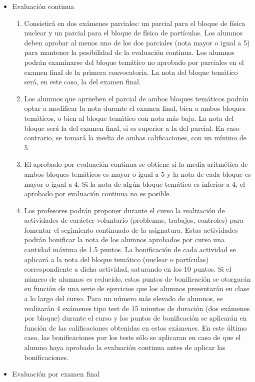 \documentclass[a4paper,12pt,twoside]{article}
\begin{document}
\begin{itemize}
\item Evaluación continua 
\begin{enumerate}[label=\alph*)]
\item Consistirá en dos exámenes parciales: un parcial para el bloque de física nuclear y un parcial para el bloque de física de partículas. Los alumnos deben aprobar al menos uno de los dos
parciales (nota mayor o igual a 5) para mantener la posibilidad de la evaluación continua. Los
alumnos podrán examinarse del bloque temático no aprobado por parciales en el examen final
de la primera convocatoria. La nota del bloque temático será, en este caso, la del examen final.
\item Los alumnos que aprueben el parcial de ambos bloques temáticos podrán 
optar a modificar la nota durante el examen final, bien a ambos bloques temáticos, o bien al
bloque temático con nota más baja. La nota del bloque será la del examen final, si es superior a la del parcial. En caso contrario, se tomará la media de ambas calificaciones, con un mínimo de
5.
\item El aprobado por evaluación continua se obtiene si la media aritmética de ambos bloques temáticos es mayor o igual a 5 y la nota de cada bloque es mayor o igual a 4. Si la nota de algún bloque temático es inferior a 4, el aprobado por evaluación continua no es posible.
\item Los profesores podrán proponer durante el curso la realización de actividades de carácter
voluntario (problemas, trabajos, controles) para fomentar el segimiento continuado de la asignatura. Estas actividades podrán bonificar la nota de los alumnos aprobados por curso una cantidad máxima de 1.5 puntos. La bonificación de cada actividad se aplicará a la nota del
bloque temático (nuclear o partículas) correspondiente a dicha actividad, saturando en los 10 puntos. Si el número de alumnos es reducido, estos puntos de bonificación se otorgarán en función de una serie de ejercicios que los alumnos presentarán en clase a lo largo del curso. Para un número más elevado de alumnos, se realizarán 4 exámenes tipo test de 15 minutos de duración (dos exámenes por bloque) durante el curso y los puntos de bonificación se aplicarán en función de las calificaciones obtenidas en estos exámenes. En este último caso, las bonificaciones por los tests sólo se aplicaran en caso de que el alumno haya aprobado la evaluación continua antes de aplicar las bonificaciones.
\end{enumerate}
\item Evaluación por examen final

\end{itemize}
\end{document}
